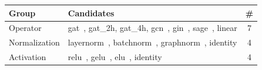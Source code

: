 \begin{tabularx}{\columnwidth}{l >{\centering\arraybackslash}X c}
\toprule
\textbf{Group} & \textbf{Candidates} & \textbf{\#}\\
\midrule
Operator & gat~\cite{gat}, gat\_2h, gat\_4h, gcn~\cite{gcn}, gin~\cite{gin}, sage~\cite{graphsage}, linear & 7\\
Normalization & layernorm~\cite{ref22}, batchnorm~\cite{ref23}, graphnorm~\cite{ref24}, identity & 4\\
Activation & relu~\cite{ref25}, gelu~\cite{ref26}, elu~\cite{ref27}, identity & 4\\
\bottomrule
\end{tabularx}
